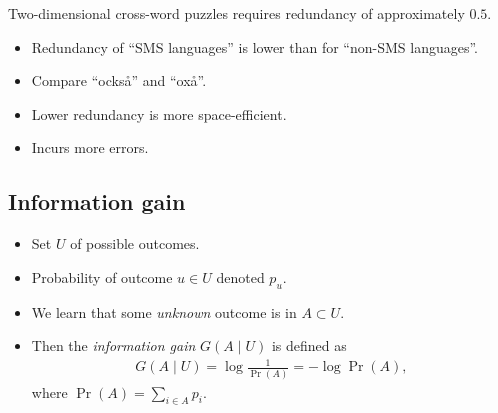 \begin{frame}
  \begin{example}
    Two-dimensional cross-word puzzles requires redundancy of approximately 
    \(0.5\).
  \end{example}

  \begin{example}
    \begin{itemize}
      \item Redundancy of \enquote{SMS languages} is lower than for 
        \enquote{non-SMS languages}.

      \item Compare \enquote{också} and \enquote{oxå}.

    \end{itemize}
  \end{example}

  \begin{remark}
    \begin{itemize}
      \item Lower redundancy is more space-efficient.
      \item Incurs more errors.
    \end{itemize}
  \end{remark}
\end{frame}

%
%
%

\subsection{Information gain}

\begin{frame}
  \begin{definition}
    \begin{itemize}
      \item Set \(U\) of possible outcomes.
      \item Probability of outcome \(u\in U\) denoted \(p_u\).
      \item We learn that some \emph{unknown} outcome is in \(A\subset U\).
      \item Then the \emph{information gain} \(G(A\mid U)\) is defined as
        \begin{align*}
          G(A\mid U) = \log\frac{1}{\Pr(A)} = -\log\Pr(A),
        \end{align*}
        where \(\Pr(A) = \sum_{i\in A} p_i\).
    \end{itemize}
  \end{definition}
\end{frame}

